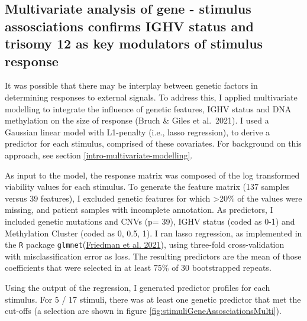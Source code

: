 \documentclass[11pt, a4paper, twosided]{book}
\begin{document}
\hypertarget{multivariate-gene-stimulus-assosciations}{%
\subsection{Multivariate analysis of gene - stimulus assosciations confirms IGHV status and trisomy 12 as key modulators of stimulus response}\label{multivariate-gene-stimulus-assosciations}}

It was possible that there may be interplay between genetic factors in determining responses to external signals. To address this, I applied multivariate modelling to integrate the influence of genetic features, IGHV status and DNA methylation on the size of response (Bruch \& Giles et al.~2021). I used a Gaussian linear model with L1-penalty (i.e., lasso regression), to derive a predictor for each stimulus, comprised of these covariates. For background on this approach, see section \ref{intro-multivariate-modelling}.

As input to the model, the response matrix was composed of the log transformed viability values for each stimulus. To generate the feature matrix (137 samples versus 39 features), I excluded genetic features for which \textgreater20\% of the values were missing, and patient samples with incomplete annotation. As predictors, I included genetic mutations and CNVs (p= 39), IGHV status (coded as 0-1) and Methylation Cluster (coded as 0, 0.5, 1). I ran lasso regression, as implemented in the \texttt{R} package \texttt{glmnet}(\protect\hyperlink{ref-R-glmnet}{Friedman et al. 2021}), using three-fold cross-validation with misclassification error as loss. The resulting predictors are the mean of those coefficients that were selected in at least 75\% of 30 bootstrapped repeats.

Using the output of the regression, I generated predictor profiles for each stimulus. For 5 / 17 stimuli, there was at least one genetic predictor that met the cut-offs (a selection are shown in figure \ref{fig:stimuliGeneAssosciationsMulti}).
\end{document}
